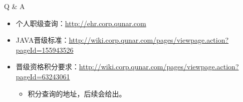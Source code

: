 \documentclass{beamer}
\begin{document}
\begin{CJK}{UTF8}{gbsn}
\begin{frame}{Q \& A}
  \begin{itemize}
  \item {
    个人职级查询：\url{http://ehr.corp.qunar.com}
  }
  \item {
    JAVA晋级标准：\url{http://wiki.corp.qunar.com/pages/viewpage.action?pageId=155943526}
  }
  \item {
    晋级资格积分要求：\url{http://wiki.corp.qunar.com/pages/viewpage.action?pageId=63243061}
    \begin{itemize}
    \item 积分查询的地址，后续会给出。
    \end{itemize}
  }
  
  \end{itemize}
\end{frame}


\end{CJK}
\end{document}
